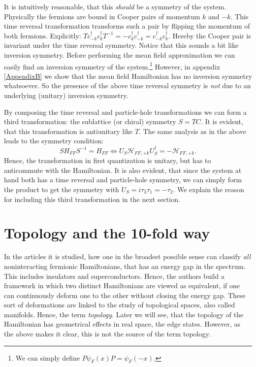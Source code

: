 It is intuitively reasonable, that this \textit{should} be a symmetry of the system. Physically the fermions are bound in Cooper pairs of momentum $k$ and $-k$. This time reversal transformation transforms such a pair by flipping the momentum of both fermions. Explicitly: $Tc^\dagger_{-k}c^\dagger_{k}T^{-1} = -c^\dagger_{k}c^\dagger_{-k} = c^\dagger_{-k}c^\dagger_{k}$. Hereby the Cooper pair is invariant under the time reversal symmetry. Notice that this sounds a bit like inversion symmetry. Before performing the mean field approximation we can easily find an inversion symmetry of the system.\footnote{We can simply define $P\psi_F(x)P = \psi_F(-x)$.} However, in appendix \ref{AppendixB} we show that the mean field Hamiltonian has no inversion symmetry whatsoever. So the presence of the above time reversal symmetry is \textit{not} due to an underlying (unitary) inversion symmetry.

By composing the time reversal and particle-hole transformations we can form a third transformation: the sublattice (or chiral) symmetry $S = TC$. It is evident, that this transformation is antiunitary like $T$. The same analysis as in the above leads to the symmetry condition:
\begin{equation}
SH_{FF}S^{-1} = H_{FF} \Leftrightarrow U_S\mathcal{H}_{FF,+k} U^\dagger_S = - \mathcal{H}_{FF,+k}.
\end{equation}
Hence, the transformation in first quantization is unitary, but has to anticommute with the Hamiltonian. It is also evident, that since the system at hand both has a time reversal and particle-hole symmetry, we can simply form the product to get the symmetry with $U_S = i\tau_3\tau_1 = -\tau_2$. We explain the reason for including this third transformation in the next section. 

\section{Topology and the 10-fold way} \label{sec.Topology10foldway}
In the articles \cite{Ludwig.Topology, Chiu.Topology} it is studied, how one in the broadest possible sense can classify \textit{all} noninteracting fermionic Hamiltonians, that has an energy gap in the spectrum. This includes insulators and superconductors. Hence, the authors build a framework in which two distinct Hamiltonians are viewed as equivalent, if one can continuously deform one to the other without closing the energy gap. These sort of deformations are linked to the study of topological spaces, also called manifolds. Hence, the term \textit{topology}. Later we will see, that the topology of the Hamiltonian has geometrical effects in real space, the edge states. However, as the above makes it clear, this is not the source of the term topology.  

